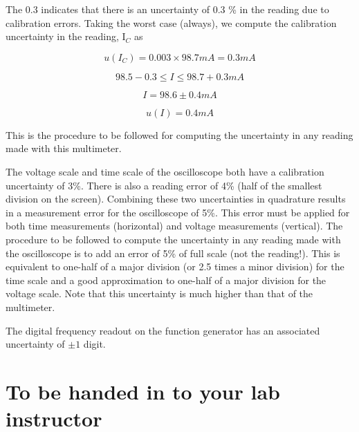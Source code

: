 The 0.3 indicates that there is an uncertainty of 0.3 \% in the reading due to calibration errors. Taking the worst case (always), we compute the calibration uncertainty in the reading,  I$_C$  as

\begin{equation}
u(I_C)=0.003\times98.7mA=0.3mA
\label{equ:ac10}
\end{equation}

\begin{equation}
98.5-0.3\leq I\leq 98.7+0.3mA
\label{equ:ac11}
\end{equation}

\begin{equation}
I=98.6\pm 0.4mA
\label{equ:ac12}
\end{equation}

\begin{equation}
u(I)=0.4mA
\label{equ:ac13}
\end{equation}

This is the procedure to be followed for computing the uncertainty in any reading made with this multimeter.

The voltage scale and time scale of the oscilloscope both have a calibration uncertainty of 3\%. There is also a reading error of 4\% (half of the smallest division on the screen). Combining these two uncertainties in quadrature results in a measurement error for the oscilloscope of 5\%. This error must be applied for both time measurements (horizontal) and voltage measurements (vertical). The procedure to be followed to compute the uncertainty in any reading made with the oscilloscope is to add an error of 5\% of full scale (not the reading!). This is equivalent to one-half of a major division (or 2.5 times a minor division) for the time scale and a good approximation to one-half of a major division for the voltage scale. Note that this uncertainty is much higher than that of the multimeter.

The digital frequency readout on the function generator has an associated uncertainty of $\pm 1$ digit.

\section{{\bf To be handed in to your lab instructor}}

